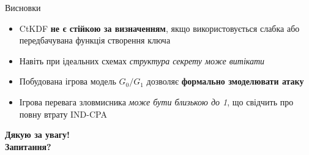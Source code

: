 \documentclass{beamer}
\begin{document}
\begin{frame}{Висновки}

\vspace{0.5em}
\begin{itemize}
  \item CtKDF \textbf{не є стійкою за визначенням}, якщо використовується слабка або передбачувана функція створення ключа
  \item Навіть при ідеальних схемах \textit{структура секрету може витікати}
  \item Побудована ігрова модель $G_0/G_1$ дозволяє \textbf{формально змоделювати атаку}
  \item Ігрова перевага зловмисника \textit{може бути близькою до 1}, що свідчить про повну втрату IND-CPA
\end{itemize}


\end{frame}

\begin{frame}
  \centering
  \vspace{2em}
  {\LARGE \textbf{Дякую за увагу!}} \\[2em]
  {\textbf{Запитання?}} \\[2em]


\end{frame}
\end{document}

